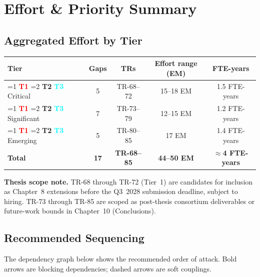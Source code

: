 \documentclass[11pt, a4paper]{article}
\newcommand{\tier}[1]{%
  \ifnum#1=1
    \colorbox{red!15}{\textcolor{red}{\textbf{\footnotesize T1}}}%
  \else\ifnum#1=2
    \colorbox{amber!20}{\textcolor{amber}{\textbf{\footnotesize T2}}}%
  \else
    \colorbox{cyan!12}{\textcolor{cyan}{\textbf{\footnotesize T3}}}%
  \fi\fi
}
\begin{document}
\section{Effort \& Priority Summary}
\label{sec:effort}

\subsection{Aggregated Effort by Tier}

\begin{center}
\begin{tabular}{@{}lcccc@{}}
\toprule
\textbf{Tier} & \textbf{Gaps} & \textbf{TRs} & \textbf{Effort range (EM)} & \textbf{FTE-years} \\
\midrule
\tier{1} Critical   & 5  & TR-68–72 & 15–18 EM & 1.5 FTE-years \\
\tier{2} Significant & 7 & TR-73–79 & 12–15 EM & 1.2 FTE-years \\
\tier{3} Emerging   & 5  & TR-80–85 & 17 EM    & 1.4 FTE-years \\
\midrule
\textbf{Total}      & \textbf{17} & \textbf{TR-68–85} & \textbf{44–50 EM} & \textbf{$\approx$4 FTE-years} \\
\bottomrule
\end{tabular}
\end{center}

\begin{infobox}
\textbf{Thesis scope note.} TR-68 through TR-72 (Tier~1) are candidates for
inclusion as Chapter~8 extensions before the Q3~2028 submission deadline, subject
to hiring. TR-73 through TR-85 are scoped as post-thesis consortium deliverables
or future-work bounds in Chapter~10 (Conclusions).
\end{infobox}

\subsection{Recommended Sequencing}

The dependency graph below shows the recommended order of attack.
Bold arrows are blocking dependencies; dashed arrows are soft couplings.
\end{document}
